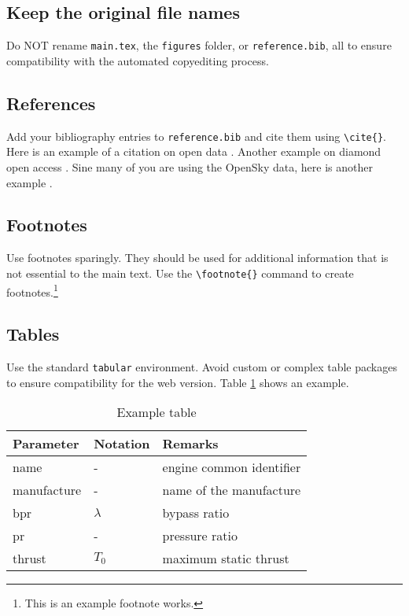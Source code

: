 \documentclass[
  manuscript=article,  %
  layout=preprint,  %
  year=20xx,
  volume=x,
]{extra/joas}
\begin{document}
\subsection{Keep the original file names}
Do NOT rename \texttt{main.tex}, the \texttt{figures} folder, or \texttt{reference.bib}, all to ensure compatibility with the automated copyediting process.

\subsection{References}
Add your bibliography entries to \texttt{reference.bib} and cite them using \verb|\cite{}|. Here is an example of a citation on open data \cite{murray2008open}. Another example on diamond open access \cite{fuchs2013diamond}. Sine many of you are using the OpenSky data, here is another example \cite{schafer2014bringing}.

\subsection{Footnotes}
Use footnotes sparingly. They should be used for additional information that is not essential to the main text. Use the \verb|\footnote{}| command to create footnotes.\footnote{This is an example footnote works.}

\subsection{Tables}
Use the standard \texttt{tabular} environment. Avoid custom or complex table packages to ensure compatibility for the web version. Table \ref{tb:example_table} shows an example.

\begin{table}[htbp!]
  \centering
  \small
  \caption{Example table}
  \label{tb:example_table}
  \begin{tabular}{lll}
  \toprule
  \textbf{Parameter} & \textbf{Notation} & \textbf{Remarks} \\
  \midrule
  name & - & engine common identifier \\
  manufacture & - & name of the manufacture  \\
  bpr & $\lambda$ & bypass ratio \\
  pr & - & pressure ratio \\
  thrust & $T_0$ & maximum static thrust\\
  \bottomrule
  \end{tabular}
\end{table}
\end{document}
